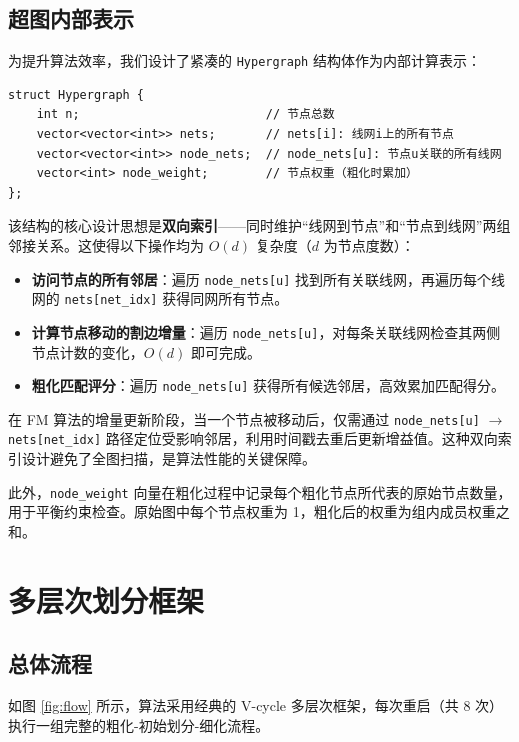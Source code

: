 \documentclass[journal, twocolumn]{IEEEtran}
\begin{document}
\subsection{超图内部表示}

为提升算法效率，我们设计了紧凑的 \texttt{Hypergraph} 结构体作为内部计算表示：

\begin{lstlisting}
struct Hypergraph {
    int n;                          // 节点总数
    vector<vector<int>> nets;       // nets[i]: 线网i上的所有节点
    vector<vector<int>> node_nets;  // node_nets[u]: 节点u关联的所有线网
    vector<int> node_weight;        // 节点权重（粗化时累加）
};
\end{lstlisting}

该结构的核心设计思想是\textbf{双向索引}——同时维护“线网到节点”和“节点到线网”两组邻接关系。这使得以下操作均为 $O(d)$ 复杂度（$d$ 为节点度数）：

\begin{itemize}
    \item \textbf{访问节点的所有邻居}：遍历 \texttt{node\_nets[u]} 找到所有关联线网，再遍历每个线网的 \texttt{nets[net\_idx]} 获得同网所有节点。
    \item \textbf{计算节点移动的割边增量}：遍历 \texttt{node\_nets[u]}，对每条关联线网检查其两侧节点计数的变化，$O(d)$ 即可完成。
    \item \textbf{粗化匹配评分}：遍历 \texttt{node\_nets[u]} 获得所有候选邻居，高效累加匹配得分。
\end{itemize}

在 FM 算法的增量更新阶段，当一个节点被移动后，仅需通过 \texttt{node\_nets[u]} $\to$ \texttt{nets[net\_idx]} 路径定位受影响邻居，利用时间戳去重后更新增益值。这种双向索引设计避免了全图扫描，是算法性能的关键保障。

此外，\texttt{node\_weight} 向量在粗化过程中记录每个粗化节点所代表的原始节点数量，用于平衡约束检查。原始图中每个节点权重为 1，粗化后的权重为组内成员权重之和。

\section{多层次划分框架}

\subsection{总体流程}

如图 \ref{fig:flow} 所示，算法采用经典的 V-cycle 多层次框架，每次重启（共 8 次）执行一组完整的粗化-初始划分-细化流程。
\end{document}
